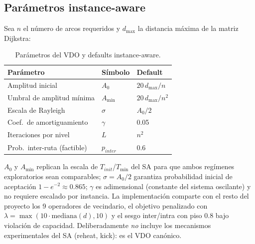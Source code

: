 \subsection{Parámetros instance-aware}
Sea $n$ el número de arcos requeridos y $d_{\max}$ la distancia máxima de la
matriz Dijkstra:

\begin{table}[htbp]
\centering
\caption{Parámetros del VDO y defaults instance-aware.}
\begin{tabular}{lll}
\toprule
Parámetro & Símbolo & Default \\
\midrule
Amplitud inicial & $A_0$ & $20\, d_{\max}/n$ \\
Umbral de amplitud mínima & $A_{\min}$ & $20\, d_{\max}/n^2$ \\
Escala de Rayleigh & $\sigma$ & $A_0/2$ \\
Coef.\ de amortiguamiento & $\gamma$ & 0.05 \\
Iteraciones por nivel & $L$ & $n^2$ \\
Prob.\ inter-ruta (factible) & $p_{inter}$ & 0.6 \\
\bottomrule
\end{tabular}
\end{table}

$A_0$ y $A_{\min}$ replican la escala de $T_{init}$/$T_{\min}$ del SA para
que ambos regímenes exploratorios sean comparables; $\sigma = A_0/2$
garantiza probabilidad inicial de aceptación $1 - e^{-2} \approx 0.865$;
$\gamma$ es adimensional (constante del sistema oscilante) y no requiere
escalado por instancia. La implementación comparte con el resto del proyecto
los 9 operadores de vecindario, el objetivo penalizado con
$\lambda = \max(10 \cdot \text{mediana}(d), 10)$ y el sesgo inter/intra con
piso $0.8$ bajo violación de capacidad. Deliberadamente \emph{no} incluye los
mecanismos experimentales del SA (reheat, kick): es el VDO canónico.

